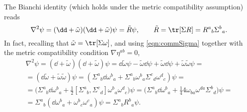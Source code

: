 \documentclass[a4paper,12pt]{book}
\begin{document}
The Bianchi identity (which holds under the metric compatibility assumption) reads
\[\nabla^2\psi=(\dd+\tilde\omega)(\dd+\tilde\omega)\psi=\tilde R\psi,\qquad \tilde R=\tr[\Sigma R]=R^a{}_b\Sigma^b{}_a.\]
In fact, recalling that $\tilde\omega=\tr[\Sigma\omega]$, and using \cref{eqn:commSigma} together with the metric compatibility condition $\nabla\eta^{ab}=0$,
\begin{multline*}
\nabla^2\psi=(\dd+\tilde\omega)(\dd+\tilde\omega)\psi=\dd\tilde\omega\psi-\tilde\omega\dd\psi+\tilde\omega\dd\psi+\tilde\omega\tilde\omega\psi=\\
=(\dd\tilde\omega+\tilde\omega\tilde\omega)\psi=(\Sigma^a{}_b\dd\omega^b{}_a+\Sigma^a{}_b\omega^b{}_a\Sigma^c{}_d\omega^d{}_c)\psi=\\
=\biggl(\Sigma^a{}_b\dd\omega^b{}_a+\frac{1}{2}[\Sigma^a{}_b,\Sigma^c{}_d]\omega^b{}_a\omega^d{}_c\biggr)\psi=\biggl(\Sigma^a{}_b\dd\omega^b{}_a+\frac{1}{4}4\omega_{ba}\omega^{da}\Sigma^b{}_d\biggr)\psi=\\
=\Sigma^a{}_b(\dd\omega^b{}_a+\omega^b{}_c\omega^c{}_a)\psi=\Sigma^a{}_bR^b{}_a\psi.
\end{multline*}
\end{document}
